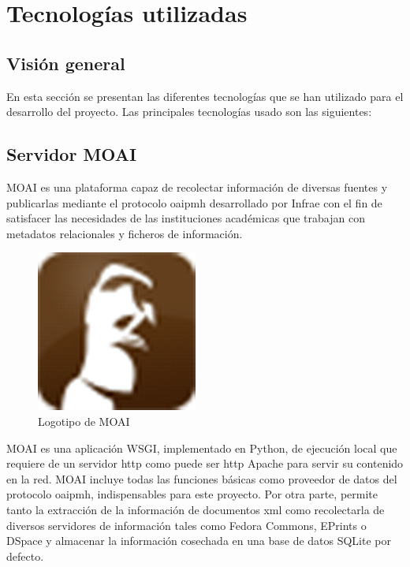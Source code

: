 \chapter{Tecnologías utilizadas}

\section{Visión general}

En esta sección se presentan las diferentes tecnologías que se han utilizado para el desarrollo del proyecto. Las principales tecnologías usado son las siguientes:

\section{Servidor MOAI}

MOAI\cite{MOAI} es una plataforma capaz de recolectar información de diversas fuentes y publicarlas mediante el protocolo \acrshort{oaipmh} desarrollado por Infrae\cite{Infrae} con el fin de satisfacer las necesidades de las instituciones académicas que trabajan con metadatos relacionales y ficheros de información.

\begin{figure}[!htbp]
	\centering
	\includegraphics{fig/moai_logo}
	\caption{Logotipo de MOAI}
\end{figure}

MOAI es una aplicación WSGI, implementado en Python, de ejecución local que requiere de un servidor \acrshort{http} como puede ser \acrshort{http} Apache\cite{HTTPApache} para servir su contenido en la red. MOAI incluye todas las funciones básicas como proveedor de datos del protocolo \acrshort{oaipmh}, indispensables para este proyecto. Por otra parte, permite tanto la extracción de la información de documentos \acrshort{xml} como recolectarla de diversos servidores de información tales como Fedora Commons\cite{Fedora}, EPrints\cite{EPrints} o DSpace\cite{DSpace} y almacenar la información cosechada en una base de datos SQLite\cite{SQLite} por defecto.

